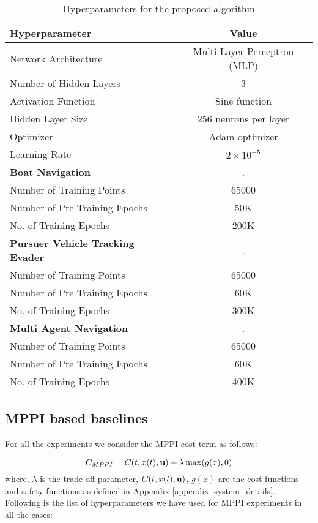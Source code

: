 \begin{table}[h]
    \centering
    \begin{tabular}{lc}
        \hline
        \textbf{Hyperparameter} & \textbf{Value} \\
        \hline
        Network Architecture & Multi-Layer Perceptron (MLP) \\
        Number of Hidden Layers & 3 \\
        Activation Function & Sine function \\
        Hidden Layer Size & 256 neurons per layer \\
        Optimizer & Adam optimizer \\
        Learning Rate & $2\times 10^{-5}$ \\
        \hline
        \textbf{Boat Navigation} & .\\
        \hline
        Number of Training Points & 65000 \\
        Number of Pre Training Epochs & 50K \\
        No. of Training Epochs & 200K\\
        \hline
        \textbf{Pursuer Vehicle Tracking Evader} & .\\
        \hline
        Number of Training Points & 65000 \\
        Number of Pre Training Epochs & 60K \\
        No. of Training Epochs & 300K\\
        \hline
        \textbf{Multi Agent Navigation} & .\\
        \hline
        Number of Training Points & 65000 \\
        Number of Pre Training Epochs & 60K \\
        No. of Training Epochs & 400K\\
        \hline
    
    \end{tabular}
    \vspace{1em}
    \caption{Hyperparameters for the proposed algorithm}
    \label{tab:training_details}
\end{table}
\vspace{-2em}
\subsection{MPPI based baselines}
For all the experiments we consider the MPPI cost term as follows:

\begin{equation}
    C_{MPPI} = C(t, x(t), \mathbf{u}) + \lambda \max(g(x), 0)
\end{equation}
where, $\lambda$ is the trade-off parameter, $C(t,x(t), \mathbf{u})$, $g(x)$ are the cost functions and safety functions as defined in Appendix \ref{appendix: system_details}. Following is the list of hyperparameters we have used for MPPI experiments in all the cases:


